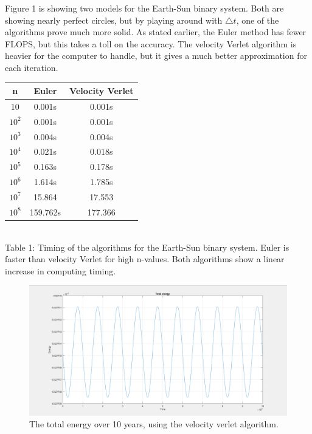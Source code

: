 \documentclass[10pt,a4paper]{article}
\begin{document}
\noindent Figure 1 is showing  two models for the Earth-Sun binary system. Both are showing nearly perfect circles, but by playing around with $\bigtriangleup t$, one of the algorithms prove much more solid. As stated earlier, the Euler method has fewer FLOPS, but this takes a toll on the accuracy. The velocity Verlet algorithm is heavier for the computer to handle, but it gives a much better approximation for each iteration. \\ 

\begin{center}
\begin{tabular}{|c|c|c|}
\hline
  n  & Euler & Velocity Verlet\\
\hline
10        & 0.001s & 0.001s \\
\hline
$10^2$      & 0.001s & 0.001s \\
\hline
$10^3$      & 0.004s & 0.004s \\
\hline
$10^4$      & 0.021s & 0.018s \\
\hline
$10^5$      & 0.163s & 0.178s \\
\hline
$10^6$      & 1.614s & 1.785s \\
\hline
$10^7$      & 15.864 & 17.553 \\
\hline
$10^8$      & 159.762s & 177.366  \\
\hline
\end{tabular}\\
Table 1: Timing of the algorithms for the Earth-Sun binary system. Euler is faster than velocity Verlet for high n-values. Both algorithms show a linear increase in computing timing. 
\end{center}



\begin{figure} [H]

\centerline{\includegraphics[scale=0.20]{TotalEnergyVerlet.png}}
\caption{The total energy over 10 years, using the velocity verlet algorithm. }


\end{figure}
\end{document}
